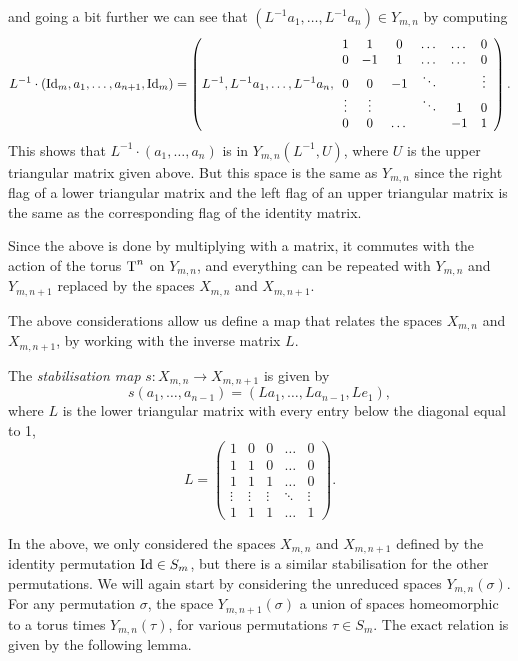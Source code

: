 and going a bit further we can see that
$(L^{-1}a_1,\dots,L^{-1}a_{n}) \in Y_{m,n}$ by computing
\[ L^{-1}\cdot \left(\operatorname{Id}_m,a_1,\dots,a_{n+1},\operatorname{Id}_m\right) =
\left(L^{-1},L^{-1}a_1,\dots,L^{-1}a_{n},
  \begin{array}{cccccc}
    1 & 1 & 0 & \dots & \dots & 0 \\
    0 & -1 & 1 & \dots & \dots& 0\\
    0 & 0 & -1 & \ddots & & \vdots\\
    \vdots & \vdots & & \ddots & 1 & 0 \\
    0 & 0 & \dots & & -1& 1
  \end{array}
\right). \] 
This shows that $L^{-1}\cdot(a_1,\dots,a_{n})$ is in
$Y_{m,n}(L^{-1},U)$, where $U$ is the
upper triangular matrix given above. But this space is the same as
$Y_{m,n}$ since the right flag of a lower triangular matrix and the
left flag of an upper triangular matrix
is the same as the corresponding flag of the identity
matrix. 

Since the above is done by multiplying with a matrix, it commutes with
the action of the torus $\operatorname{T}^n$ on $Y_{m,n}$, and everything can be
repeated with $Y_{m,n}$ and $Y_{m,n+1}$ replaced by the spaces
$X_{m,n}$ and $X_{m,n+1}$.

The above considerations allow us define a map that relates the spaces
$X_{m,n}$ and $X_{m,n+1}$, by working with the inverse matrix $L$.
\begin{definition}
  \label{def:stabilisering}
  The \textit{stabilisation map} $s : X_{m,n} \to X_{m,n+1}$ is given
  by
  \[ s\left(a_1,\dots,a_{n-1}\right) =
  \left(La_1,\dots,La_{n-1},Le_1\right), \]
  where $L$ is the lower triangular matrix with every entry below the
  diagonal equal to 1,
  \[ L =
  \begin{pmatrix}
    1 & 0 & 0 & \dots & 0 \\
    1 & 1 & 0 & \dots & 0 \\
    1 & 1 & 1 & \dots & 0 \\
    \vdots & \vdots & \vdots & \ddots & \vdots \\
    1 & 1 & 1 & \dots & 1
  \end{pmatrix}. \]
\end{definition}

In the above, we only considered the spaces $X_{m,n}$ and $X_{m,n+1}$
defined by the identity permutation $\operatorname{Id}\in S_m$,
but there is a similar stabilisation for the other permutations. We
will again start by considering the unreduced spaces
$Y_{m,n}(\sigma)$. For
any permutation $\sigma$, the space $Y_{m,n+1}(\sigma)$ a union of
spaces homeomorphic to a torus times $Y_{m,n}(\tau)$, for various
permutations $\tau\in S_m$. The exact relation is given by the
following lemma.


